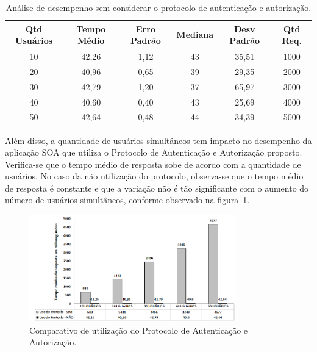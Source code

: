 \begin{table}[h]
\begin{center}
\begin{tabular}{|c|c|c|c|c|c|}
\hline
Qtd Usuários    & Tempo Médio    & Erro Padrão & Mediana  & Desv Padrão & Qtd Req. \\ \hline
10              & 42,26          & 1,12        & 43       & 35,51       &  1000       \\ \hline
20              & 40,96          & 0,65        & 39       & 29,35       &  2000       \\ \hline
30              & 42,79          & 1,20        & 37       & 65,97       &  3000       \\ \hline
40              & 40,60          & 0,40        & 43       & 25,69       &  4000       \\ \hline
50              & 42,64          & 0,48        & 44       & 34,39       &  5000       \\ \hline
\end{tabular}\caption {An\'{a}lise de desempenho sem considerar o protocolo de autenticação e autorização.}\label{tb:estatistica_sem_cripto}
\end{center}
\end{table}

Al\'{e}m disso, a quantidade de usuários simultâneos tem impacto no desempenho da aplicação SOA que utiliza o Protocolo de Autenticação e Autorização proposto. Verifica-se que o tempo médio de resposta sobe de acordo com a quantidade de usuários. No caso da não utilização do protocolo, observa-se que o tempo médio de resposta é constante e que a variação não \'{e} tão significante com o aumento do número de usuários simultâneos, conforme observado na figura~\ref{fig:grafico_teste_desempenho}.

\begin{figure}[!htb]
    \centering
    \includegraphics[width=0.8\textwidth]{grafico_teste_desempenho2.png}
    \caption{Comparativo de utilização do Protocolo de Autenticação e Autorização.}
    \label{fig:grafico_teste_desempenho}
\end{figure}

